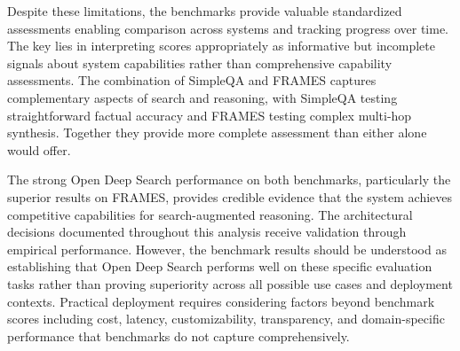 Despite these limitations, the benchmarks provide valuable standardized assessments enabling comparison across systems and tracking progress over time. The key lies in interpreting scores appropriately as informative but incomplete signals about system capabilities rather than comprehensive capability assessments. The combination of SimpleQA and FRAMES captures complementary aspects of search and reasoning, with SimpleQA testing straightforward factual accuracy and FRAMES testing complex multi-hop synthesis. Together they provide more complete assessment than either alone would offer.

The strong Open Deep Search performance on both benchmarks, particularly the superior results on FRAMES, provides credible evidence that the system achieves competitive capabilities for search-augmented reasoning. The architectural decisions documented throughout this analysis receive validation through empirical performance. However, the benchmark results should be understood as establishing that Open Deep Search performs well on these specific evaluation tasks rather than proving superiority across all possible use cases and deployment contexts. Practical deployment requires considering factors beyond benchmark scores including cost, latency, customizability, transparency, and domain-specific performance that benchmarks do not capture comprehensively.
